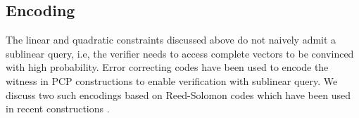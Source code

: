 \subsection{Encoding}\label{subsec:encode2D} 

The linear and quadratic constraints discussed above do not naively admit a sublinear query, i.e, the verifier needs to access complete vectors to be convinced with high probability. Error correcting codes have been used to encode the witness in PCP constructions to enable verification with sublinear query. We discuss two such encodings based on Reed-Solomon codes which have been used in recent constructions \cite{ligero, aurora, STARK2019}.
\begin{comment}
To encode a vector $x\in \bbF^\circsize$, one specifies two domains $G,H\subseteq \bbF$. We will call $G$ as {\em interpolation} domain and $H$ as {\em evaluation} domain. The encoding in \cite{aurora} encodes the vector $x$ as a single Reed-Solomon codeword. This is done by first constructing a polynomial $\hat{f}^x$ which interpolates the vector $x$ on $G$, and then computing its evaluations $\langle \hat{f}^x(\eta) \rangle_{\alpha\in H}$ on points in $H$. The sizes of domains $G$ and $H$ need to be $\Omega(\circsize)$ in the above encoding. For a vector $x$, we will use the notation $\hat{f}^x$ to denote the polynomial interpolating $x$ on $G$, and $f^x$ to denote the vector of evaluations of $\hat{f}^x$ on $H$. Thus in the above scheme, $f^x$ is an encoding of the vector $x$.
\dnote{should we replace the notation $\langle \hat{f}^x(\eta) \rangle_{\alpha\in H}$ with $\langle \hat{f}^x(\eta) \rangle_{\eta \in H}$? Isn't $\eta$ the variable?}

An alternative encoding used in \cite{ligero} encodes parts of a vector separately, and thus the encoded vector corresponds to a set of Reed-Solomon codewords, or a single codeword of an Interleaved Reed-Solomon code (see Definition \ref{defn:interleavedcode}). More specifically, one chooses integers $m$ and $\ell$ such that $m\ell \geq \circsize$ and domains $G$ and $H$ of size $\Omega(\ell)$. The vector $x\in \bbF^\circsize$ is written as
$x=(x_1|\cdots|x_m)$ where $x_i\in \bbF^{\ell}$ for all $i\in [m]$. The vector $x$ is encoded as $(f^x_1,\ldots,f^x_m)$ where $f^x_i$ encodes $x_i$ as described before, i.e $f^x_i=\langle \hat{f}^x_i(\eta)\rangle_{\alpha\in H}$ where the polynomial $\hat{f}^x_i$ interpolates the vector $x_i$ on $G$. 
\end{comment}
